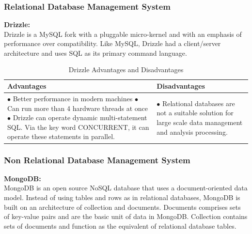\subsubsection{Relational Database Management System}

\textbf{\normalsize{Drizzle:}}\\

Drizzle is a MySQL fork with a pluggable micro-kernel and with an emphasis of performance over compatibility. Like MySQL, Drizzle had a client/server architecture and uses SQL as its primary command language.

\begin{table}[H]
\caption{Drizzle Advantages and Disadvantages}
\begin{center}
\begin{tabularx}{17cm}{ |p{8.5cm}|X| } 
 \hline
 \textbf{Advantages} & \textbf{Disadvantages } \\ \hline
 $\bullet$ Better performance in modern machines \newline $\bullet$ Can run more than 4 hardware threads at once \newline $\bullet$ Drizzle can operate dynamic multi-statement SQL. Via the key word CONCURRENT, it can operate these statements in parallel. &  $\bullet$ Relational databases are not a suitable solution for large scale data management and analysis processing. \\ \hline

\end{tabularx}
\end{center}
\end{table}
\subsubsection{Non Relational Database Management System}
\textbf{\normalsize{MongoDB:}}\\

MongoDB is an open source NoSQL database that uses a document-oriented data model. Instead of using tables and rows as in relational databases, MongoDB is built on an architecture of collection and documents. Documents comprises sets of key-value pairs and are the basic unit of data in MongoDB. Collection contains sets of documents and function as the equivalent of relational database tables.\\



